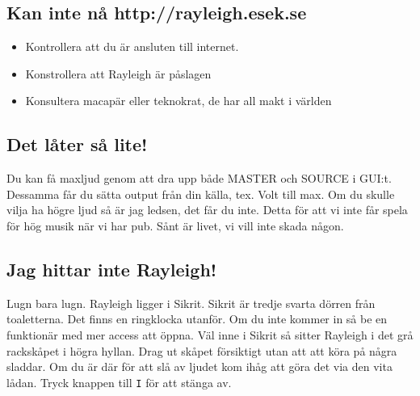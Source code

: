\documentclass[10pt]{article}
\begin{document}
    \subsection{Kan inte nå http://rayleigh.esek.se}
        \begin{itemize}
            \item Kontrollera att du är ansluten till internet.
            \item Konstrollera att Rayleigh är påslagen
            \item  Konsultera macapär eller teknokrat, de har all makt i världen
        \end{itemize}
    \subsection{Det låter så lite!}
        Du kan få maxljud genom att dra upp både MASTER och SOURCE i GUI:t. Dessamma får du sätta output från din källa, tex. Volt till max. Om du skulle vilja ha högre ljud så är jag ledsen, det får du inte. Detta för att vi inte får spela för hög musik när vi har pub. Sånt är livet, vi vill inte skada någon.
    \subsection{Jag hittar inte Rayleigh!}
        Lugn bara lugn. Rayleigh ligger i Sikrit. Sikrit är tredje svarta dörren från toaletterna. Det finns en ringklocka utanför. Om du inte kommer in så be en funktionär med mer access att öppna. Väl inne i Sikrit så sitter Rayleigh i det grå rackskåpet i högra hyllan. Drag ut skåpet försiktigt utan att att köra på några sladdar. 
        \newline \newline
        Om du är där för att slå av ljudet kom ihåg att göra det via den vita lådan. Tryck knappen till \texttt{I} för att stänga av.
\end{document}
